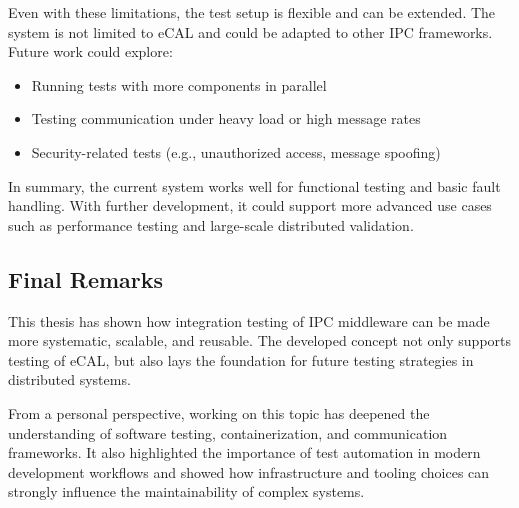 \vspace{1em}
Even with these limitations, the test setup is flexible and can be extended. The system is not limited to eCAL and could be adapted to other IPC frameworks. Future work could explore:

\begin{itemize}
	\item Running tests with more components in parallel
	\item Testing communication under heavy load or high message rates
	\item Security-related tests (e.g., unauthorized access, message spoofing)
\end{itemize}

\vspace{1em}
In summary, the current system works well for functional testing and basic fault handling. With further development, it could support more advanced use cases such as performance testing and large-scale distributed validation.


\vspace{1em}
\subsection*{Final Remarks}

\vspace{1em}
This thesis has shown how integration testing of IPC middleware can be made more systematic, scalable, and reusable. The developed concept not only supports testing of eCAL, but also lays the foundation for future testing strategies in distributed systems.

\vspace{1em}
From a personal perspective, working on this topic has deepened the understanding of software testing, containerization, and communication frameworks. It also highlighted the importance of test automation in modern development workflows and showed how infrastructure and tooling choices can strongly influence the maintainability of complex systems.

\clearpage
